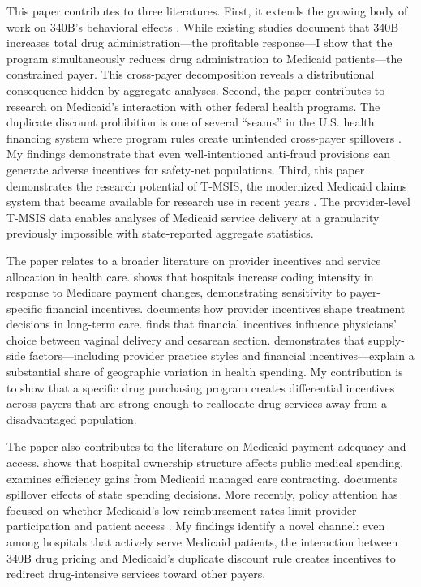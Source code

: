 \documentclass[12pt]{article}
\begin{document}
This paper contributes to three literatures. First, it extends the growing body of work on 340B's behavioral effects \citep{nikpay2018effect, desai2020association, huang2024biosimilar, mulligan2020impact}. While existing studies document that 340B increases total drug administration---the profitable response---I show that the program simultaneously reduces drug administration to Medicaid patients---the constrained payer. This cross-payer decomposition reveals a distributional consequence hidden by aggregate analyses. Second, the paper contributes to research on Medicaid's interaction with other federal health programs. The duplicate discount prohibition is one of several ``seams'' in the U.S. health financing system where program rules create unintended cross-payer spillovers \citep{duggan2000hospital, currie2008medicaid, dranove2017does}. My findings demonstrate that even well-intentioned anti-fraud provisions can generate adverse incentives for safety-net populations. Third, this paper demonstrates the research potential of T-MSIS, the modernized Medicaid claims system that became available for research use in recent years \citep{cms2024tmsis}. The provider-level T-MSIS data enables analyses of Medicaid service delivery at a granularity previously impossible with state-reported aggregate statistics.

The paper relates to a broader literature on provider incentives and service allocation in health care. \citet{dafny2005does} shows that hospitals increase coding intensity in response to Medicare payment changes, demonstrating sensitivity to payer-specific financial incentives. \citet{einav2018provider} documents how provider incentives shape treatment decisions in long-term care. \citet{gruber1997physician} finds that financial incentives influence physicians' choice between vaginal delivery and cesarean section. \citet{finkelstein2016sources} demonstrates that supply-side factors---including provider practice styles and financial incentives---explain a substantial share of geographic variation in health spending. My contribution is to show that a specific drug purchasing program creates differential incentives across payers that are strong enough to reallocate drug services away from a disadvantaged population.

The paper also contributes to the literature on Medicaid payment adequacy and access. \citet{duggan2000hospital} shows that hospital ownership structure affects public medical spending. \citet{duggan2004does} examines efficiency gains from Medicaid managed care contracting. \citet{baicker2005spillover} documents spillover effects of state spending decisions. More recently, policy attention has focused on whether Medicaid's low reimbursement rates limit provider participation and patient access \citep{clemens2014fiscal}. My findings identify a novel channel: even among hospitals that actively serve Medicaid patients, the interaction between 340B drug pricing and Medicaid's duplicate discount rule creates incentives to redirect drug-intensive services toward other payers.
\end{document}
